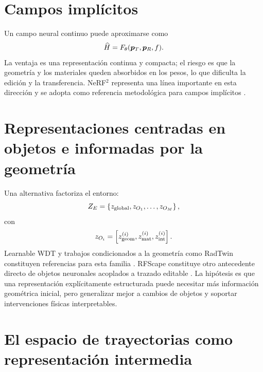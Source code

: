 \section{Campos implícitos}

Un campo neural continuo puede aproximarse como
\begin{equation}
\widehat H=F_\theta(\bm{p}_T,\bm{p}_R,f).
\end{equation}
La ventaja es una representación continua y compacta; el riesgo es que la geometría y los materiales queden absorbidos en los pesos, lo que dificulta la edición y la transferencia. NeRF$^2$ representa una línea importante en esta dirección y se adopta como referencia metodológica para campos implícitos \citep{Zhao2023NeRF2}.

\section{Representaciones centradas en objetos e informadas por la geometría}

Una alternativa factoriza el entorno:
\begin{equation}
Z_E=\left\{z_{\rm global},z_{O_1},\ldots,z_{O_M}\right\},
\end{equation}
con
\begin{equation}
z_{O_i}=\left[z_{\rm geom}^{(i)},z_{\rm mat}^{(i)},z_{\rm int}^{(i)}\right].
\end{equation}
Learnable WDT y trabajos condicionados a la geometría como RadTwin constituyen referencias para esta familia \citep{Jiang2025LearnableWDT,Zhang2026RadTwin}. RFScape constituye otro antecedente directo de objetos neuronales acoplados
a trazado editable \citep{Chen2025RFScape}. La hipótesis es que una representación explícitamente estructurada puede necesitar más información geométrica inicial, pero generalizar mejor a cambios de objetos y soportar intervenciones físicas interpretables.

\section{El espacio de trayectorias como representación intermedia}

